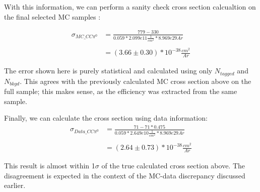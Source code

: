 \documentclass[12pt]{article}
\begin{document}
With this information, we can perform a sanity check cross section calcualtion on the final selected MC samples : 

\begin{align}
\sigma_{MC\_CC\pi^0} &= \frac{779 - 330}{0.059 * 2.099e11 \frac{1}{cm^2} * 8.969e29 Ar} \\\\
&= (3.66 \pm 0.30) *10^{-38} \frac{cm^2}{Ar}
\end{align}

The error shown here is purely statistical and calculated using only $N_{tagged}$ and $N_{bkgd}$. This agrees with the previously calculated MC cross section above on the full sample; this makes sense, as the efficiency was extracted from the same sample.  
\par Finally, we can calculate the cross section using data information:
\begin{align}
\sigma_{Data\_CC\pi^0} &= \frac{71 - 71*0.475}{0.059 * 2.649e10 \frac{1}{cm^2} * 8.969e29 Ar} \\\\
&= (2.64 \pm 0.73) *10^{-38} \frac{cm^2}{Ar}
\end{align}

This result is almost within 1$\sigma$ of the true calculated cross section above. The disagreement is expected in the context of the MC-data discrepancy discussed earlier.
\end{document}
